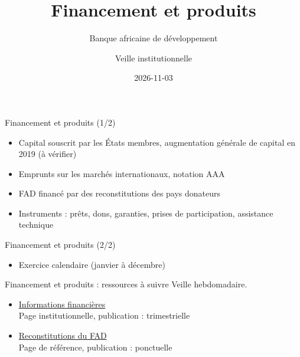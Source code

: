 \documentclass[aspectratio=169,11pt]{beamer}
\title{Financement et produits}
\subtitle{Banque africaine de développement}
\author{Veille institutionnelle}
\date{2026-11-03}
\begin{document}
\begin{frame}\titlepage\end{frame}

\begin{frame}{Financement et produits (1/2)}
\begin{itemize}
\item Capital souscrit par les États membres, augmentation générale de capital en 2019 (à vérifier)
\item Emprunts sur les marchés internationaux, notation AAA
\item FAD financé par des reconstitutions des pays donateurs
\item Instruments : prêts, dons, garanties, prises de participation, assistance technique
\end{itemize}
\end{frame}

\begin{frame}{Financement et produits (2/2)}
\begin{itemize}
\item Exercice calendaire (janvier à décembre)
\end{itemize}
\end{frame}

\begin{frame}{Financement et produits : ressources à suivre}
\small
Veille hebdomadaire.
\begin{itemize}
\item \href{https://www.afdb.org/en/about-us/corporate-information/financial-information}{Informations financières}\\{\footnotesize Page institutionnelle, publication : trimestrielle}
\item \href{https://www.afdb.org/en/about-us/african-development-fund/adf-replenishments}{Reconstitutions du FAD}\\{\footnotesize Page de référence, publication : ponctuelle}
\end{itemize}
\end{frame}
\end{document}
